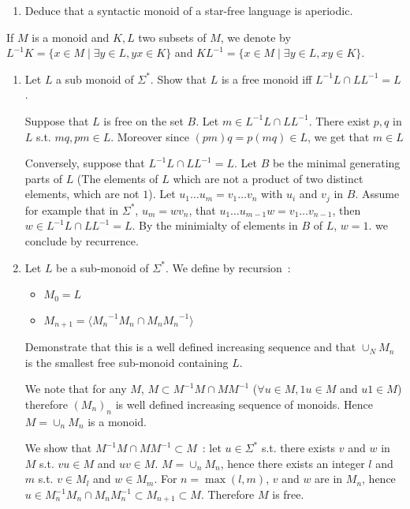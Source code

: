 \documentclass[a4paper,11pt]{exam}
\begin{document}
\begin{questions}
\begin{enumerate}[resume]
\begin{enumerate}
        \item Deduce that a syntactic monoid of a star-free language is aperiodic.
      \end{enumerate}
   

  \end{enumerate}

 \question
If $M$ is a monoid and $K, L$ two subsets of $M$, we denote by  $L^{-1}K = \{ x\in M \mid \exists y \in L, yx \in K \}$ and  $KL^{-1} = \{ x\in M \mid \exists y \in L, xy \in K \}$.
\begin{enumerate}
	\item Let $L$ a sub monoid of $\Sigma^*$. Show that $L$ is a free monoid iff $L^{-1}L \cap LL^{-1}=L$.
	
	\begin{solution}
		Suppose that $L$ is free on the set $B$. 
		Let $m \in L^{-1}L \cap LL^{-1}$.
		There exist $p,q$ in $L$ s.t. $mq,pm \in L$.
		Moreover since $(pm)q=p(mq)\in L$, we get that $m\in L$

		\smallskip
		
		Conversely, suppose that $L^{-1}L \cap LL^{-1}=L$. Let $B$ be the minimal generating parts of $L$ (The elements of $L$ which are not a product of two distinct elements, which are not $1$).
		Let $u_1 \dots u_m = v_1 \dots v_n$ with $u_i$ and $v_j$ in $B$.
		Assume for example that in $\Sigma^*$, $u_m=wv_n$, that
		$u_1 \dots u_{m-1} w = v_1 \dots v_{n-1}$, then
		$w \in L^{-1}L \cap LL^{-1}=L$.
		By the minimialty of elements in $B$ of $L$, $w=1$.
		we conclude by recurrence.
	\end{solution}
	
	\item Let $L$ be a sub-monoid of $\Sigma^*$. We define by recursion~:
	\begin{itemize}
		\item $M_0 = L$
		\item $M_{n+1} = \langle {M_n}^{-1}{M_n} \cap {M_n}{M_n}^{-1} \rangle$
	\end{itemize}
	Demonstrate that this is a well defined increasing sequence and that $\cup_N M_n$ is the smallest free sub-monoid containing $L$.
	
	\begin{solution}
		We note that for any $M$,
		$M \subset M^{-1}M \cap MM^{-1}$ ($\forall u \in M, 1u \in M$ and
		$u1 \in M$) therefore $(M_n)_n$ is well defined increasing sequence of monoids.
		Hence $M = \cup_n M_n$ is a monoid.
		
		We show that $M^{-1}M \cap MM^{-1} \subset M$~:
		let $u \in \Sigma^*$ s.t. there exists $v$ and $w$ in $M$ s.t. $vu \in M$ and $uv \in M$.
		$M = \cup_n M_n$, hence there exists an integer $l$ and $m$ s.t. $v \in M_l$ and $w \in M_m$.
		For $n=\max(l,m)$, $v$ and $w$ are in $M_n$, hence
		$u \in M_n^{-1}M_n \cap M_n M_n^{-1} \subset M_{n+1} \subset M$.
		Therefore $M$ is free.
		

\end{solution}
\end{enumerate}
\end{questions}
\end{document}
